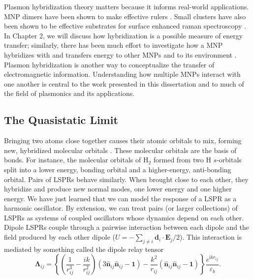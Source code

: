 \documentclass [11pt, proquest] {uwthesis}[2016/11/22]
\begin{document}
Plasmon hybridization theory matters because it informs real-world applications. MNP dimers have been shown to make effective rulers \cite{Ruler}. Small clusters have also been shown to be effective substrates for surface enhanced raman spectroscopy \cite{SERS}. In Chapter 2, we will discuss how hybridization is a possible measure of energy transfer; similarly, there has been much effort to investigate how a MNP hybridizes with and transfers energy to other MNPs and to its environment \cite{CubeSubstrate,ARAVIND1981,ThakkarLandau}. Plasmon hybridization is another way to conceptualize the transfer of electromagnetic information. Understanding how multiple MNPs interact with one another is central to the work presented in this dissertation and to much of the field of plasmonics and its applications.

\subsection{The Quasistatic Limit}
Bringing two atoms close together causes their atomic orbitals to mix, forming new, hybridized molecular orbitals \cite{LennardJones}. These molecular orbitals are the basis of bonds. For instance, the molecular orbitals of $\textrm{H}_2$ formed from two H $s$-orbitals split into a lower energy, bonding orbital and a higher-energy, anti-bonding orbital. Pairs of LSPRs behave similarly. When brought close to each other, they hybridize and produce new normal modes, one lower energy and one higher energy. We have just learned that we can model the response of a LSPR as a harmonic oscillator. By extension, we can treat pairs (or larger collections) of LSPRs as systems of coupled oscillators whose dynamics depend on each other. Dipole LSPRs couple through a pairwise interaction between each dipole and the field produced by each other dipole ($U = -\sum_{j\neq i}\textbf{d}_i\cdot\textbf{E}_j/2$). This interaction is mediated by something called the dipole relay tensor
\begin{equation}
\boldsymbol{\Lambda}_{ij} = \left\{\left(\frac{1}{r_{ij}^3} - \frac{ik}{r_{ij}^2}\right)\left(3\hat{\textbf{n}}_{ij}\hat{\textbf{n}}_{ij} - \textbf{1}\right) - \frac{k^2}{r_{ij}}\left(\hat{\textbf{n}}_{ij}\hat{\textbf{n}}_{ij} - \textbf{1}\right)\right\}\frac{e^{\textrm{i}kr_{ij}}}{\varepsilon_b}.
\label{dipole_relay_tensor_full}
\end{equation}
\end{document}
